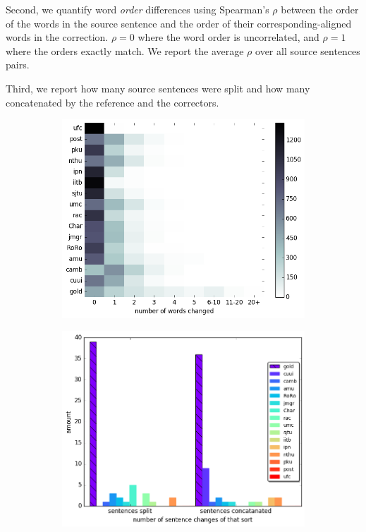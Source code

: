 \documentclass[letterpaper, 11pt]{article}
\begin{document}
Second, we quantify word \emph{order} differences using
Spearman's $\rho$ between the order of the words in the source sentence
and the order of their corresponding-aligned words in the correction.
$\rho=0$ where the word order is uncorrelated, and $\rho=1$ where the orders exactly match. We report the average $\rho$ over all source sentences pairs. 

Third, we report how many source sentences were split and how many concatenated by the reference and the correctors.

\begin{figure}
	\vspace{-0.8cm}
  \centering
  \begin{subfigure}[]{0.35\textwidth}
    \includegraphics[width = \textwidth]{words_differences_heat}
  \end{subfigure}
  \begin{subfigure}[]{0.35\textwidth}
    \includegraphics[width = \textwidth]{aligned}

\end{subfigure}
\end{figure}
\end{document}
